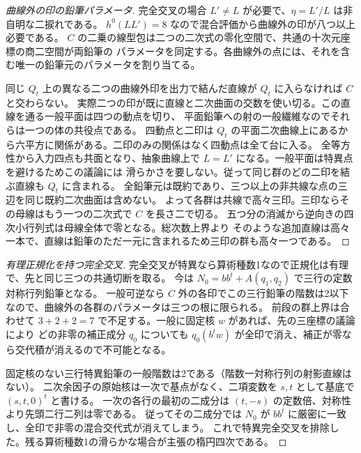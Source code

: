 \begin{proof}[曲線外の印の鉛筆パラメータ]
完全交叉の場合 $L'\ne L$ が必要で、$\eta=L'/L$ は非自明な二捩れである。
$h^0(LL')=8$ なので混合評価から曲線外の印が八つ以上必要である。
$C$ の二乗の線型包は二つの二次式の零化空間で、共通の十次元座標の商二空間が両鉛筆の
パラメータを同定する。各曲線外の点には、それを含む唯一の鉛筆元のパラメータを割り当てる。

同じ $Q_t$ 上の異なる二つの曲線外印を出力で結んだ直線が $Q_t$ に入らなければ $C$ と交わらない。
実際二つの印が既に直線と二次曲面の交数を使い切る。この直線を通る一般平面は四つの動点を切り、
平面鉛筆への射の一般繊維なのでそれらは一つの体の共役点である。
四動点と二印は $Q_t$ の平面二次曲線上にあるから六平方に関係がある。二印のみの関係はなく四動点は全て台に入る。
全等方性から入力四点も共面となり、抽象曲線上で $L=L'$ になる。一般平面は特異点を避けるためこの議論には
滑らかさを要しない。従って同じ群のどの二印を結ぶ直線も $Q_t$ に含まれる。
全鉛筆元は既約であり、三つ以上の非共線な点の三辺を同じ既約二次曲面は含めない。
よって各群は共線で高々三印。三印ならその母線はもう一つの二次式で $C$ を長さ二で切る。
五つ分の消滅から逆向きの四次小行列式は母線全体で零となる。総次数上界より
そのような追加直線は高々一本で、直線は鉛筆のただ一元に含まれるため三印の群も高々一つである。
\end{proof}
\begin{proof}[有理正規化を持つ完全交叉]
完全交叉が特異なら算術種数1なので正規化は有理で、先と同じ三つの共通切断を取る。
今は $N_0=bb^t+A(q_1,q_2)$ で三行の定数対称行列鉛筆となる。
一般可逆なら $C$ 外の各印でこの三行鉛筆の階数は2以下なので、曲線外の各群のパラメータは三つの根に限られる。
前段の群上界は合わせて $3+2+2=7$ で不足する。一般に固定核 $w$ があれば、先の三座標の議論により
どの非零の補正成分 $q_0$ についても $q_0(b^tw)$ が全印で消え、補正が零なら交代積が消えるので不可能となる。

固定核のない三行特異鉛筆の一般階数は2である（階数一対称行列の射影直線はない）。
二次余因子の原始核は一次で基点がなく、二項変数を $s,t$ として基底で $(s,t,0)^t$ と書ける。
一次の各行の最初の二成分は $(t,-s)$ の定数倍、対称性より先頭二行二列は零である。
従ってその二成分では $N_0$ が $bb^t$ に厳密に一致し、全印で非零の混合交代式が消えてしまう。
これで特異完全交叉を排除した。残る算術種数1の滑らかな場合が主張の楕円四次である。
\end{proof}
